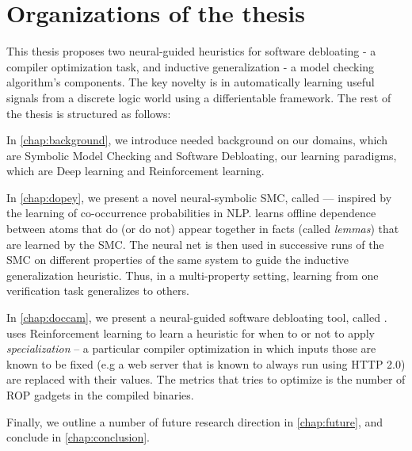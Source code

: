 \section{Organizations of the thesis}
This thesis proposes two neural-guided heuristics for  software debloating - a compiler optimization task, and inductive generalization - a model checking algorithm's components. The key novelty is in automatically learning useful signals from a discrete logic world using a differientable framework. The rest of the thesis is structured as follows:

In \cref{chap:background}, we introduce needed background on our domains, which are Symbolic Model Checking and Software Debloating, our learning paradigms, which are Deep learning and Reinforcement learning.

In \cref{chap:dopey}, we present a novel neural-symbolic SMC, called \dpy --- inspired by the
learning of co-occurrence probabilities in NLP. \dpy
learns offline dependence between atoms that do (or do not) appear together in
facts (called \emph{lemmas}) that are learned by the SMC. The neural net
is then used in successive runs of the SMC on different properties of the same system to guide 
the inductive generalization heuristic. Thus, in a
multi-property setting, learning from one verification task generalizes to
others.

In \cref{chap:doccam}, we present a neural-guided software debloating tool, called \doccam. \doccam uses Reinforcement learning to learn a heuristic for when to or not to apply \emph{specialization} -- a particular compiler optimization in which inputs those are known to be fixed (e.g a web server that is known to always run using HTTP 2.0) are replaced with their values. The metrics that \doccam tries to optimize is the number of ROP gadgets in the compiled binaries.

Finally, we outline a number of future research direction in \cref{chap:future}, and conclude in \cref{chap:conclusion}.